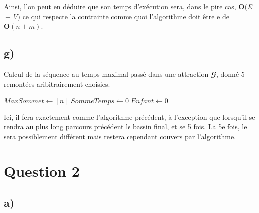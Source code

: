 \documentclass[11pt,a4paper, oneside, oldfontcommands]{memoir}
\newcommand{\G}{$\mathbfcal{G}$}
\newcommand{\V}{$\textit{V}$}
\newcommand{\E}{$\textit{E}$}
\begin{document}
Ainsi, l’on peut en déduire que son temps d’exécution sera, dans le pire cas, $\textbf{O}(\E{} + \V{})$ ce 
qui respecte la contrainte comme quoi l'algorithme doit être e de $\textbf{O}(n + m)$.

\newpage
\section{g)}
\IncMargin{1em}
\begin{algorithm}[H]

  \caption{Calcul de la séquence au temps maximal passé dans une attraction \G{}, donné 5 remontées aribitrairement choisies.}
  \DontPrintSemicolon
  \LinesNumbered
  \SetAlgoLined

  $MaxSommet \leftarrow [n]$\;
  $SommeTemps \leftarrow 0$\;
  $Enfant \leftarrow 0$\;

  \;
\end{algorithm}
\DecMargin{1em}

  \BlankLine

  Ici, il fera exactement comme l'algorithme précédent, à l'exception que lorsqu'il se rendra au plus long parcours précédent le bassin final,
  et se 5 fois. La 5e fois, le sera possiblement différent mais restera cependant couvers par l'algorithme.\\[1em]

\chapter{Question 2}
\section{a)}
\end{document}
